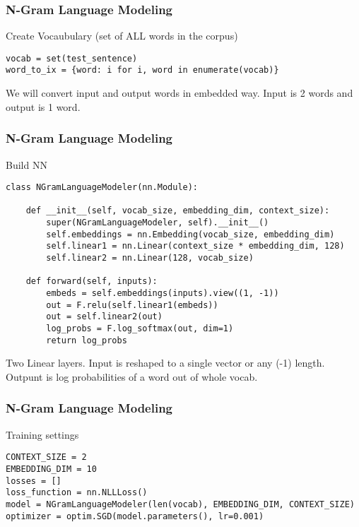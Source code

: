 \begin{frame}[fragile]
\frametitle{N-Gram Language Modeling}
Create Vocaubulary (set of ALL words in the corpus)
 \begin{lstlisting}
vocab = set(test_sentence)
word_to_ix = {word: i for i, word in enumerate(vocab)}
\end{lstlisting}    

We will convert input and output words in embedded way. Input is 2 words and output is 1 word.      
\end{frame} 

\begin{frame}[fragile]
\frametitle{N-Gram Language Modeling}
Build NN
 \begin{lstlisting}
class NGramLanguageModeler(nn.Module):

    def __init__(self, vocab_size, embedding_dim, context_size):
        super(NGramLanguageModeler, self).__init__()
        self.embeddings = nn.Embedding(vocab_size, embedding_dim)
        self.linear1 = nn.Linear(context_size * embedding_dim, 128)
        self.linear2 = nn.Linear(128, vocab_size)

    def forward(self, inputs):
        embeds = self.embeddings(inputs).view((1, -1))
        out = F.relu(self.linear1(embeds))
        out = self.linear2(out)
        log_probs = F.log_softmax(out, dim=1)
        return log_probs
\end{lstlisting}     
Two Linear layers. Input is reshaped to a single vector or any (-1) length. Outpunt is log probabilities of a word out of whole vocab.     
\end{frame} 

\begin{frame}[fragile]
\frametitle{N-Gram Language Modeling}
Training settings
 \begin{lstlisting}
CONTEXT_SIZE = 2
EMBEDDING_DIM = 10
losses = []
loss_function = nn.NLLLoss()
model = NGramLanguageModeler(len(vocab), EMBEDDING_DIM, CONTEXT_SIZE)
optimizer = optim.SGD(model.parameters(), lr=0.001)
\end{lstlisting}     

\end{frame} 

